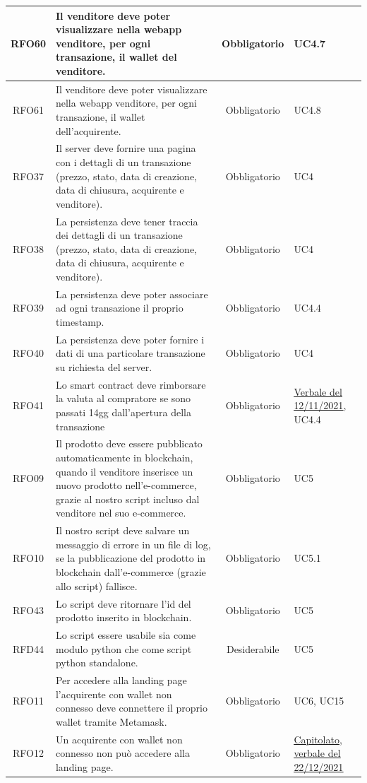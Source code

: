 \documentclass[a4paper, 12pt]{article}
\begin{document}
\begin{longtable}{|c|p{7cm}|c|p{4cm}|}
\hline
RFO60 & Il venditore deve poter visualizzare nella webapp venditore, per ogni transazione, il wallet del venditore. & Obbligatorio & UC4.7 \\
\hline
RFO61 & Il venditore deve poter visualizzare nella webapp venditore, per ogni transazione, il wallet dell'acquirente. & Obbligatorio & UC4.8 \\
\hline
RFO37 & Il server deve fornire una pagina con i dettagli di un transazione (prezzo, stato, data di creazione, data di chiusura, acquirente e venditore). & Obbligatorio & UC4 \\
\hline
RFO38 & La persistenza deve tener traccia dei dettagli di un transazione (prezzo, stato, data di creazione, data di chiusura, acquirente e venditore). & Obbligatorio & UC4 \\
\hline
RFO39 & La persistenza deve poter associare ad ogni transazione il proprio timestamp. & Obbligatorio & UC4.4 \\
\hline
RFO40 & La persistenza deve poter fornire i dati di una particolare transazione su richiesta del server. & Obbligatorio & UC4 \\
\hline
RFO41 & Lo smart contract deve rimborsare la valuta al compratore se sono passati 14gg dall'apertura della transazione & Obbligatorio & \underline{\href{https://github.com/iota97/WinningSoftwareSolution/blob/main/public/interni/verbali/2021_11_12_I.pdf}{Verbale del 12/11/2021}}, UC4.4 \\
\hline
RFO09 & Il prodotto deve essere pubblicato automaticamente in blockchain, quando il venditore inserisce un nuovo prodotto nell'e-commerce, grazie al nostro script incluso dal venditore nel suo e-commerce. & Obbligatorio & UC5 \\
\hline
RFO10 & Il nostro script deve salvare un messaggio di errore in un file di log, se la pubblicazione del prodotto in blockchain dall'e-commerce (grazie allo script) fallisce. & Obbligatorio & UC5.1 \\
\hline
RFO43 & Lo script deve ritornare l'id del prodotto inserito in blockchain. & Obbligatorio & UC5 \\
\hline
RFD44 & Lo script essere usabile sia come modulo python che come script python standalone. & Desiderabile & UC5 \\
\hline
RFO11 & Per accedere alla landing page l'acquirente con wallet non connesso deve connettere il proprio wallet tramite Metamask. & Obbligatorio & UC6, UC15 \\
\hline
RFO12 & Un acquirente con wallet non connesso non può accedere alla landing page. & Obbligatorio & \underline{\href{https://www.math.unipd.it/~tullio/IS-1/2021/Progetto/C2.pdf}{Capitolato}}, \underline{\href{https://github.com/iota97/WinningSoftwareSolution/blob/main/public/esterni/verbali/2021_12_22_E.pdf}{verbale del 22/12/2021}} \\

\end{longtable}
\end{document}
